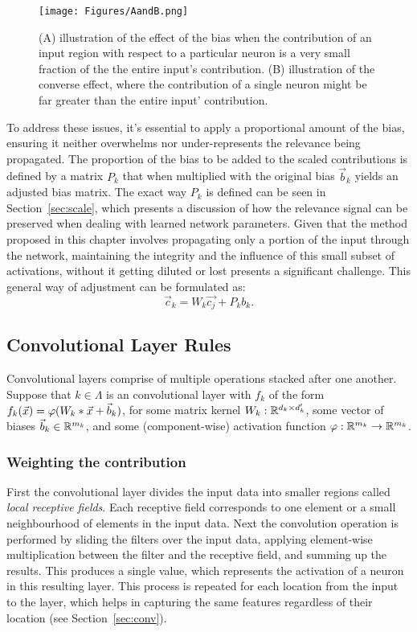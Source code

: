 \begin{figure}[ht!]
	\begin{center}
		\texttt{[image: Figures/AandB.png]}
	\end{center}
	\caption{(A) illustration of the effect of the bias when the contribution of an input region with respect to a particular neuron is a very small fraction of the the entire input's contribution. (B) illustration of the converse effect, where the contribution of a single neuron might be far greater than the entire input' contribution.}
	\label{fig:Neurons_with_bias}
\end{figure} 
To address these issues, it's essential to apply a proportional amount of the bias, ensuring it neither overwhelms nor under-represents the relevance being propagated. The proportion of the bias to be added to the scaled contributions is defined by a matrix $P_{k}$ that when multiplied with the original bias $\vec{b}_k$ yields an adjusted bias matrix. The exact way $P_{k}$ is defined can be seen in Section~\ref{sec:scale}, which presents a discussion of how the relevance signal can be preserved when dealing with learned network parameters. Given that the method proposed in this chapter involves propagating only a portion of the input through the network, maintaining the integrity and the influence of this small subset of activations, without it getting diluted or lost presents a significant challenge. This general way of adjustment can be formulated as:
\begin{equation}
   \vec{c}_k  = W_k \vec{c_j} +  P_{k}{b}_k.
\end{equation} 
\subsection{Convolutional Layer Rules}
Convolutional layers comprise of multiple operations stacked after one another. Suppose that $k\in \Lambda$ is an convolutional layer with $f_k$ of the form $f_k(\vec{x})=\varphi(W_k\ast\vec{x} + \vec{b}_k)$, for some matrix kernel $W_k:\mathbb{R}^{d_k\times d_k'}$, some vector of biases $\vec{b}_k\in \mathbb{R}^{m_k}$, and some (component-wise) activation function $\varphi:\mathbb{R}^{m_k}\to \mathbb{R}^{m_k}$. 

\subsubsection{Weighting the contribution}
First the convolutional layer divides the input data into smaller regions called \emph{local receptive fields}. Each receptive field corresponds to one element or a small neighbourhood of elements in the input data. Next the convolution operation is performed by sliding the filters over the input data, applying element-wise multiplication between the filter and the receptive field, and summing up the results. This produces a single value, which represents the activation of a neuron in this resulting layer. This process is repeated for each location from the input to the layer, which helps in capturing the same features regardless of their location (see Section~\ref{sec:conv}).

